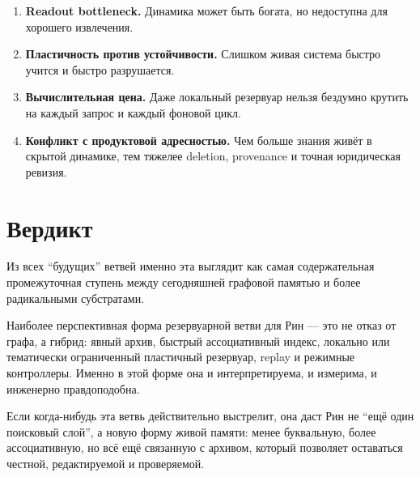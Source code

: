 \begin{enumerate}
\item \textbf{Readout bottleneck.} Динамика может быть богата, но недоступна для
хорошего извлечения.
\item \textbf{Пластичность против устойчивости.} Слишком живая система быстро учится и
быстро разрушается.
\item \textbf{Вычислительная цена.} Даже локальный резервуар нельзя бездумно крутить на
каждый запрос и каждый фоновой цикл.
\item \textbf{Конфликт с продуктовой адресностью.} Чем больше знания живёт в скрытой
динамике, тем тяжелее deletion, provenance и точная юридическая ревизия.
\end{enumerate}

\section{Вердикт}

Из всех ``будущих'' ветвей именно эта выглядит как самая содержательная промежуточная
ступень между сегодняшней графовой памятью и более радикальными субстратами.

\begin{principle}
Наиболее перспективная форма резервуарной ветви для Рин — это не отказ от графа, а
гибрид: явный архив, быстрый ассоциативный индекс, локально или тематически ограниченный
пластичный резервуар, replay и режимные контроллеры. Именно в этой форме она и
интерпретируема, и измерима, и инженерно правдоподобна.
\end{principle}

Если когда-нибудь эта ветвь действительно выстрелит, она даст Рин не ``ещё один
поисковый слой'', а новую форму живой памяти: менее буквальную, более ассоциативную,
но всё ещё связанную с архивом, который позволяет оставаться честной, редактируемой
и проверяемой.
